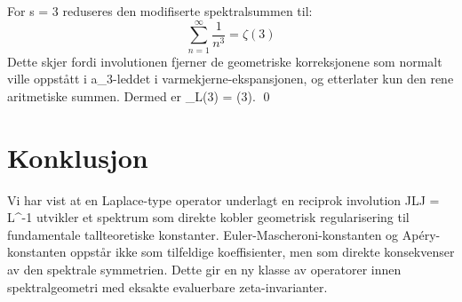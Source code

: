 \documentclass[12pt]{article}
\begin{document}
For s = 3 reduseres den modifiserte spektralsummen til:
\[ \sum_{n=1}^\infty \frac{1}{n^3} = \zeta(3) \]
Dette skjer fordi involutionen fjerner de geometriske korreksjonene som normalt ville oppstått i a_3-leddet i varmekjerne-ekspansjonen, og etterlater kun den rene aritmetiske summen. Dermed er \zeta_L(3) = \zeta(3). \qed

\section{Konklusjon}
Vi har vist at en Laplace-type operator underlagt en reciprok involution JLJ = L^{-1} utvikler et spektrum som direkte kobler geometrisk regularisering til fundamentale tallteoretiske konstanter. Euler-Mascheroni-konstanten og Apéry-konstanten oppstår ikke som tilfeldige koeffisienter, men som direkte konsekvenser av den spektrale symmetrien. Dette gir en ny klasse av operatorer innen spektralgeometri med eksakte evaluerbare zeta-invarianter.
\end{document}
